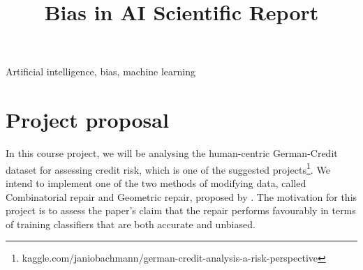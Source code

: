 \documentclass[conference]{IEEEtran}
\begin{document}
\title{Bias in AI Scientific Report}

\author{
}

\maketitle

\begin{abstract}

\end{abstract}

\begin{IEEEkeywords}
Artificial intelligence, bias, machine learning
\end{IEEEkeywords}

\section{Project proposal}

In this course project, we will be analysing the human-centric German-Credit dataset for assessing credit risk, which is one of the suggested projects\footnote{kaggle.com/janiobachmann/german-credit-analysis-a-risk-perspective}. We intend to implement one of the two methods of modifying data, called Combinatorial repair
and Geometric repair, proposed by \cite{Feldman2015ComputationalFP}. The motivation for this project is to assess the paper's claim that the repair performs favourably in terms of training classifiers that are both accurate and unbiased.
\end{document}
